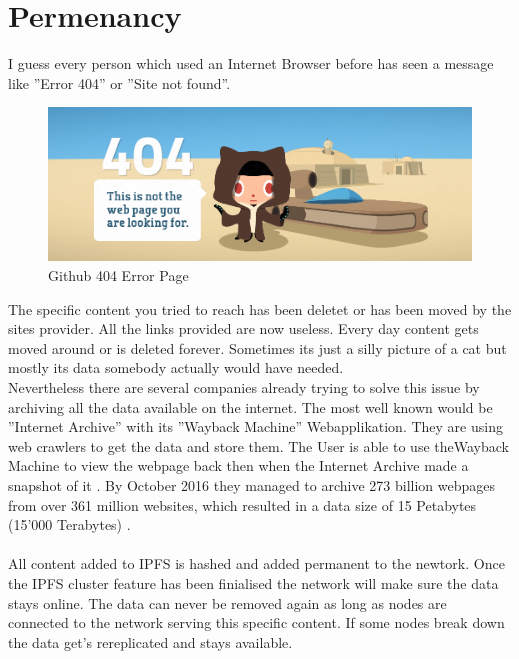 \documentclass[a4paper,11pt, oneside]{report}
\theoremstyle{definition}
\begin{document}
\section{Permenancy}
I guess every person which used an Internet Browser before has seen a message like ''Error 404'' or ''Site not found''.
\begin{figure}[H]
\centering
\includegraphics[width=\textwidth]{img/github-404.png}
\caption[Github 404 Error Page]{Github 404 Error Page}
\end{figure}
\noindent
The specific content you tried to reach has been deletet or has been moved by the sites provider. All the links provided are now useless. Every day content gets moved around or is deleted forever. Sometimes its just a silly picture of a cat but mostly its data somebody actually would have needed.\\[0.3cm]
Nevertheless there are several companies already trying to solve this issue by archiving all the data available on the internet. The most well known would be ''Internet Archive'' with its ''Wayback Machine'' Webapplikation. They are using web crawlers to get the data and store them. The User is able to use theWayback Machine to view the webpage back then when the Internet Archive made a snapshot of it \cite{InternetArchive}. By October 2016 they managed to archive 273 billion webpages from over 361 million websites, which resulted in a data size of 15 Petabytes (15'000 Terabytes) \cite{InternetArchiveCount}.\\ \\
All content added to IPFS is hashed and added permanent to the newtork. Once the IPFS cluster feature has been finialised the network will make sure the data stays online. The data can never be removed again as long as nodes are connected to the network serving this specific content. If some nodes break down the data get's rereplicated and stays available.
\end{document}
